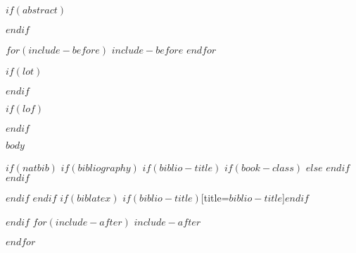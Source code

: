 \documentclass[$if(fontsize)$$fontsize$,$endif$$if(lang)$$babel-lang$,$endif$$if(papersize)$$papersize$paper,$endif$$for(classoption)$$classoption$$sep$,$endfor$]{$documentclass$}
\begin{document}
$if(abstract)$
  \begin{abstract}
    $abstract$
  \end{abstract}
$endif$

$for(include-before)$
$include-before$
$endfor$

$if(lot)$
  \listoftables
$endif$

$if(lof)$
  \listoffigures
$endif$

$body$

$if(natbib)$
$if(bibliography)$
$if(biblio-title)$
$if(book-class)$
\renewcommand\bibname{$biblio-title$}
$else$
\renewcommand\refname{$biblio-title$}
$endif$
$endif$


$endif$
$endif$
$if(biblatex)$
\printbibliography$if(biblio-title)$[title=$biblio-title$]$endif$

$endif$
$for(include-after)$
$include-after$

$endfor$
\end{document}
